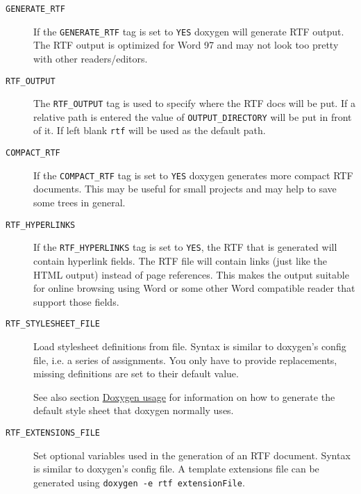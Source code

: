  \begin{description}
\item[{\tt GENERATE\_\-RTF} ] If the {\tt GENERATE\_\-RTF} tag is set to {\tt YES} doxygen will generate RTF output. The RTF output is optimized for Word 97 and may not look too pretty with other readers/editors.

\label{config_cfg_rtf_output}
\hypertarget{config_cfg_rtf_output}{}
 \item[{\tt RTF\_\-OUTPUT} ] The {\tt RTF\_\-OUTPUT} tag is used to specify where the RTF docs will be put. If a relative path is entered the value of {\tt OUTPUT\_\-DIRECTORY} will be put in front of it. If left blank {\tt rtf} will be used as the default path.

\label{config_cfg_compact_rtf}
\hypertarget{config_cfg_compact_rtf}{}
 \item[{\tt COMPACT\_\-RTF} ] If the {\tt COMPACT\_\-RTF} tag is set to {\tt YES} doxygen generates more compact RTF documents. This may be useful for small projects and may help to save some trees in general.

\label{config_cfg_rtf_hyperlinks}
\hypertarget{config_cfg_rtf_hyperlinks}{}
 \item[{\tt RTF\_\-HYPERLINKS} ] If the {\tt RTF\_\-HYPERLINKS} tag is set to {\tt YES}, the RTF that is generated will contain hyperlink fields. The RTF file will contain links (just like the HTML output) instead of page references. This makes the output suitable for online browsing using Word or some other Word compatible reader that support those fields.

\label{config_cfg_rtf_stylesheet_file}
\hypertarget{config_cfg_rtf_stylesheet_file}{}
 \item[{\tt RTF\_\-STYLESHEET\_\-FILE} ] Load stylesheet definitions from file. Syntax is similar to doxygen's config file, i.e. a series of assignments. You only have to provide replacements, missing definitions are set to their default value.

See also section \hyperlink{doxygen_usage}{Doxygen usage} for information on how to generate the default style sheet that doxygen normally uses.

\label{config_cfg_rtf_extensions_file}
\hypertarget{config_cfg_rtf_extensions_file}{}
 \item[{\tt RTF\_\-EXTENSIONS\_\-FILE} ]Set optional variables used in the generation of an RTF document. Syntax is similar to doxygen's config file. A template extensions file can be generated using {\tt doxygen -e rtf extensionFile}.

\end{description}
